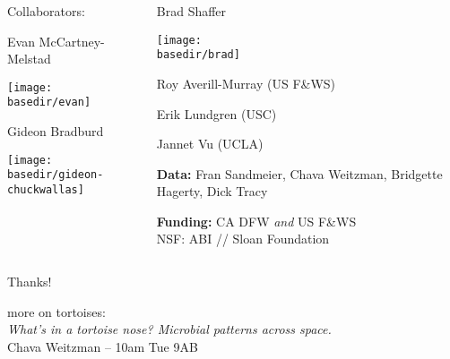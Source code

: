 \documentclass{beamer}
\newcommand{\basedir}{files}
\begin{document}

\begin{frame}{}

  \begin{columns}[c]
    \begin{column}{.4\textwidth}
      \begin{center}
        {\struct Collaborators:}

          {Evan McCartney-Melstad}

          \texttt{[image: \\basedir/evan]}

      {Gideon Bradburd}

          \texttt{[image: \\basedir/gideon-chuckwallas]}

      \end{center}
    \end{column}
    \begin{column}{.6\textwidth}

        \vspace{-2em}
      {Brad Shaffer}

        \texttt{[image: \\basedir/brad]}

        Roy Averill-Murray (US F\&WS)

        Erik Lundgren (USC)
      \vspace{0.5em}

        Jannet Vu (UCLA)
      \vspace{0.5em}

      \textbf{Data:}
      Fran Sandmeier, Chava Weitzman, Bridgette Hagerty, Dick Tracy
      \vspace{0.5em}

      \textbf{Funding:}
        CA DFW \textit{and} US F\&WS \\
      NSF: ABI // 
      Sloan Foundation

    \end{column}
  \end{columns}

\end{frame}

\begin{frame}{ }

    \centering
    \vfill

    \Large Thanks!

    \vfill
    {\aside more on tortoises:}\\
    {\it What's in a tortoise nose? Microbial patterns across space.} \\
    Chava Weitzman -- 10am Tue 9AB
    \vfill

\end{frame}
\end{document}
